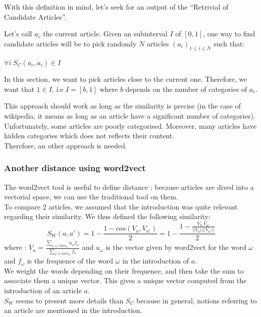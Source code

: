 \documentclass[11pt]{article}
\theoremstyle{plain}
\theoremstyle{definition}
\theoremstyle{remark}
\begin{document}
\vspace*{5mm}
With this definition in mind, let's seek for an output of the ``Retrivial of Candidate Articles''.


Let's call $a_c$ the current article.
Given an subinterval $I$ of $[0,1]$, one way to find candidate articles will be to pick randomly $N$ articles $(a_i)_{1 \leq i \leq N}$ such that:
\begin{center}
  $\forall i \; S_C(a_c,a_i) \in I$
\end{center}

In this section, we want to pick articles close to the current one. Therefore, we want that $1 \in I$, i.e $I=[b,1]$ where $b$ depends on the number of categories of $a_c$.



\vspace*{5mm}
This approach should work as long as the similarity is precise (in the case of wikipedia, it means as long as an article have a significant number of categories). Unfortunately, some articles are poorly categorised. Moreover, many articles have hidden categories which does not reflects their content. \\
Therefore, an other approach is needed.


\subsubsection{Another distance using word2vect}
The word2vect tool is useful to define distance : because articles are dived into a vectorial space, we can use the traditional tool on them. \\
To compare 2 articles, we assumed that the introduction was quite relevant regarding their similarity. We thus defined the following similarity:
$$S_W(a,a') = 1- \frac{1 - cos(V_a,V_{a'})}{2}= 1-\frac{1-\frac{V_a.V_{a'}}{||V_a||||V_{a'}||}}{2}$$
where : $V_a = \frac{\sum_{\omega\in intro_a}u_\omega f_\omega}{\sum_{\omega\in intro_a}f_\omega}$ and $u_\omega$ is the vector given by word2vect for the word $\omega$ and $f_\omega$ is the frequence of the word $\omega$ in the introduction of $a$.\\
We weight the words depending on their frequence, and then take the sum to associate them a unique vector. This gives a unique vector computed from the introduction of an article $a$.\\
$S_W$ seems to present more details than $S_C$ because in general, notions referring to an article are mentioned in the introduction. 
\end{document}
